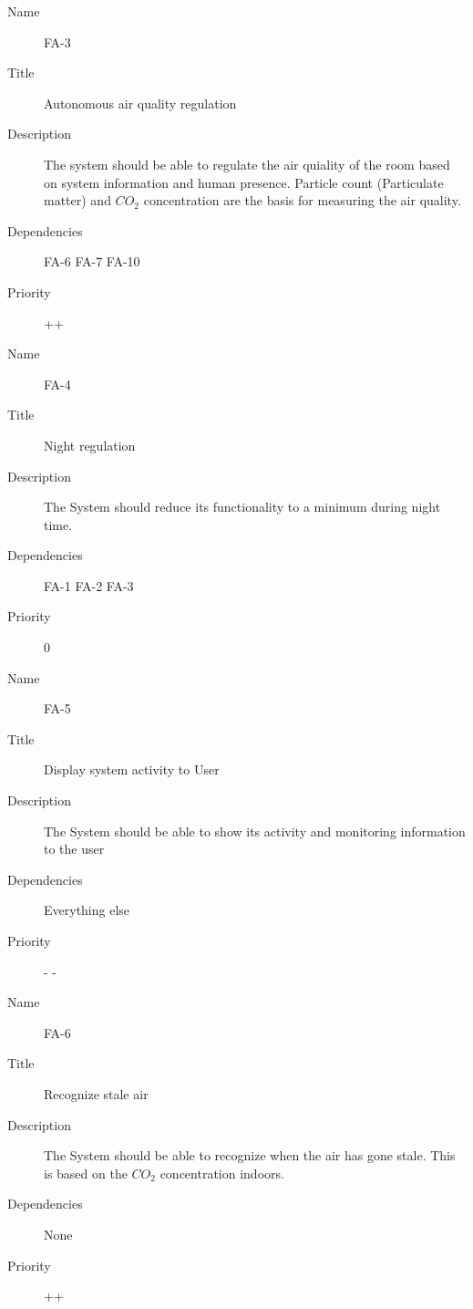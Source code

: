 \documentclass[runningheads]{llncs}
\begin{document}
    \begin{description}
        \item[Name] FA-3
        \item[Title] Autonomous air quality regulation
        \item[Description] The system should be able to regulate the air quiality of the room based on system information and human presence. Particle count (Particulate matter) and $CO_2$ concentration are the basis for measuring the air quality.
        \item[Dependencies] FA-6 FA-7 FA-10
        \item[Priority] ++
    \end{description}

    \begin{description}
        \item[Name] FA-4
        \item[Title] Night regulation
        \item[Description] The System should reduce its functionality to a minimum during night time.
        \item[Dependencies] FA-1 FA-2 FA-3
        \item[Priority] 0
    \end{description}

    \begin{description}
        \item[Name] FA-5
        \item[Title] Display system activity to User
        \item[Description] The System should be able to show its activity and monitoring information to the user
        \item[Dependencies] Everything else
        \item[Priority] - -
    \end{description}

    \begin{description}
        \item[Name] FA-6
        \item[Title] Recognize stale air
        \item[Description] The System should be able to recognize when the air has gone stale. This is based on the $CO_2$ concentration indoors.
        \item[Dependencies] None
        \item[Priority] ++
    \end{description}
\end{document}
